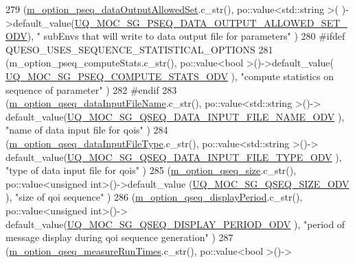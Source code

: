 \begin{DoxyCode}
279     (\hyperlink{class_q_u_e_s_o_1_1_monte_carlo_s_g_options_a496b1325324965abbeffd3ef8b919975}{m\_option\_pseq\_dataOutputAllowedSet}.c\_str(), po::value<std::string >(
      )->default\_value(\hyperlink{_monte_carlo_s_g_options_8h_a207a542a633a248cfa2e24254b9e084b}{UQ\_MOC\_SG\_PSEQ\_DATA\_OUTPUT\_ALLOWED\_SET\_ODV}), \textcolor{stringliteral}{"
      subEnvs that will write to data output file for parameters"}  )
280 #ifdef QUESO\_USES\_SEQUENCE\_STATISTICAL\_OPTIONS
281     (m\_option\_pseq\_computeStats.c\_str(),         po::value<bool        >()->default\_value(
      \hyperlink{_monte_carlo_s_g_options_8h_ada46f5319f17f130f942366728a385e9}{UQ\_MOC\_SG\_PSEQ\_COMPUTE\_STATS\_ODV}          ), \textcolor{stringliteral}{"compute statistics on
       sequence of parameter"}                 )
282 #endif
283     (\hyperlink{class_q_u_e_s_o_1_1_monte_carlo_s_g_options_adfa1e97f82f761f277721e3002fa5be5}{m\_option\_qseq\_dataInputFileName}.c\_str(),    po::value<std::string >()->
      default\_value(\hyperlink{_monte_carlo_s_g_options_8h_a362582367efdc7499fbd8a2153acca82}{UQ\_MOC\_SG\_QSEQ\_DATA\_INPUT\_FILE\_NAME\_ODV}   ), \textcolor{stringliteral}{"name of
       data input file for qois"}                            )
284     (\hyperlink{class_q_u_e_s_o_1_1_monte_carlo_s_g_options_a93530ee50a7e47ad57b46ca6cf04a60c}{m\_option\_qseq\_dataInputFileType}.c\_str(),    po::value<std::string >()->
      default\_value(\hyperlink{_monte_carlo_s_g_options_8h_ad7dc9950138b8f479608834c5bb662c5}{UQ\_MOC\_SG\_QSEQ\_DATA\_INPUT\_FILE\_TYPE\_ODV}   ), \textcolor{stringliteral}{"type of
       data input file for qois"}                            )
285     (\hyperlink{class_q_u_e_s_o_1_1_monte_carlo_s_g_options_ab720df7bb4ec0dbffd231de174d30423}{m\_option\_qseq\_size}.c\_str(),                 po::value<unsigned int>()->default\_value
      (\hyperlink{_monte_carlo_s_g_options_8h_ae8dc1f788898174d2c827d271d4c72a3}{UQ\_MOC\_SG\_QSEQ\_SIZE\_ODV}                   ), \textcolor{stringliteral}{"size of qoi sequence"}                 
                             )
286     (\hyperlink{class_q_u_e_s_o_1_1_monte_carlo_s_g_options_a14d5adea03855e45e535cf10cf8ea3ae}{m\_option\_qseq\_displayPeriod}.c\_str(),        po::value<unsigned int>()->
      default\_value(\hyperlink{_monte_carlo_s_g_options_8h_a7103fc85197b23e5faa62d81c1adbe72}{UQ\_MOC\_SG\_QSEQ\_DISPLAY\_PERIOD\_ODV}         ), \textcolor{stringliteral}{"period of message
       display during qoi sequence generation"}    )
287     (\hyperlink{class_q_u_e_s_o_1_1_monte_carlo_s_g_options_a16456d0bcab4d4aca08b02f0ce123b07}{m\_option\_qseq\_measureRunTimes}.c\_str(),      po::value<bool        >()->

\end{DoxyCode}
